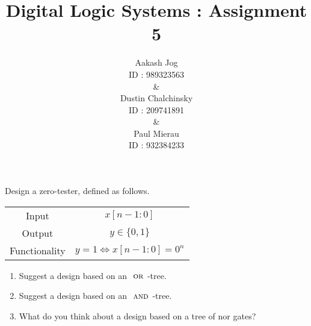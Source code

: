 \documentclass[fleqn, a4paper, 11pt, oneside]{amsart}
\title{Digital Logic Systems : Assignment 5}
\author{
	Aakash Jog\\
	ID : 989323563\\
	\&\\
	Dustin Chalchinsky\\
	ID : 209741891\\
	\&\\
	Paul Mierau\\
	ID : 932384233
	}
\date{\formatdate{12}{5}{2015}}
\theoremstyle{definition}
\theoremstyle{theorem}
\theoremstyle{remark}
\renewcommand{\And}{{\textsc{ and }}}
\newcommand{\Or}{{\textsc{ or }}}
\begin{document}
	
\maketitle

\begin{question}
	Design a zero-tester, defined as follows.\\
	\begin{tabular}{c c}
		Input         & $x[n - 1 : 0]$                  \\
		Output        & $y \in \{0,1\}$                 \\
		Functionality & $y = 1 \iff x[n - 1 : 0] = 0^n$ \\
	\end{tabular}
	\begin{enumerate}
		\item Suggest a design based on an $\Or$-tree.
		\item Suggest a design based on an $\And$-tree.
		\item What do you think about a design based on a tree of nor gates?
	\end{enumerate}
\end{question}
\end{document}
